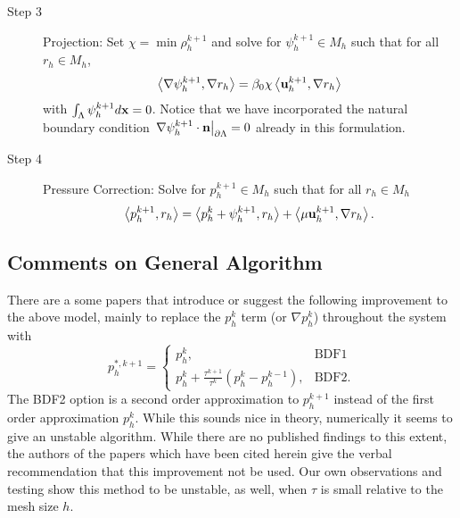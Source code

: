 \documentclass[letterpaper]{erdc}
\begin{document}
\begin{description}
\item[Step 3] Projection: Set $\chi = \min \rho_h^{k+1}$ and solve for $\psi_h^{k+1}\in M_h$ such that for all $r_h\in M_h$,
\begin{equation}
 \left\langle \nabla \psi_h^{k+1}, \nabla r_h \right\rangle = \beta_0 \chi \left\langle \textbf{u}_h^{k+1}, \nabla r_h \right\rangle
\end{equation}
with $\int_{\Lambda}\psi_h^{k+1}d\textbf{x} = 0$.  Notice that we have incorporated the natural boundary condition $\left.\nabla\psi_h^{k+1}\cdot\textbf{n}\right|_{\partial\Lambda} = 0 $ already in this formulation.  

\item[Step 4] Pressure Correction: Solve for $p_h^{k+1}\in M_h$ such that for all $r_h\in M_h$
\begin{equation}
  \left\langle p_h^{k+1}, r_h \right\rangle = \left\langle p_h^{k} + \psi_h^{k+1}, r_h \right\rangle + \left\langle \mu \textbf{u}_h^{k+1}, \nabla r_h \right\rangle.
\end{equation}
\end{description}

%
%
\subsection{Comments on General Algorithm}
\begin{remark}
There are a some papers that introduce or suggest the following improvement to the above model, mainly to replace the $p^{k}_h$ term (or $\nabla p^{k}_h$) throughout the system with
\begin{equation}
  p_h^{*,k+1} = \begin{cases}
                p_h^{k}, & \mbox{BDF1}\\
                p_h^{k} + \frac{\tau^{k+1}}{\tau^{k}}\left( p_h^k - p_h^{k-1} \right), & \mbox{BDF2}.
                \end{cases}
\end{equation}
The BDF2 option is a second order approximation to $p^{k+1}_h$ instead of the first order approximation $p_h^k$.  While this sounds nice in theory, numerically it seems to give an unstable algorithm.  While there are no published findings to this extent, the authors of the papers which have been cited herein give the verbal recommendation that this improvement not be used.  Our own observations and testing show this method to be unstable, as well, when $\tau$ is small relative to the mesh size $h$.
\end{remark}
\end{document}
